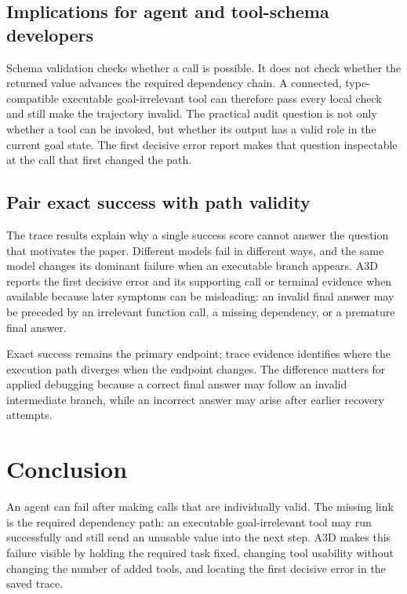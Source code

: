 \documentclass[pdflatex,sn-basic]{sn-jnl}
\begin{document}
\subsection{Implications for agent and tool-schema developers}

Schema validation checks whether a call is possible. It does not check whether
the returned value advances the required dependency chain. A connected,
type-compatible executable goal-irrelevant tool can therefore pass every local
check and still make the trajectory invalid. The practical audit question is not
only whether a tool can be invoked, but whether its output has a valid role in
the current goal state. The first decisive error report makes that question inspectable
at the call that first changed the path.

\subsection{Pair exact success with path validity}

The trace results explain why a single success score cannot answer the question
that motivates the paper. Different models fail in different ways, and the
same model changes its dominant failure when an executable branch appears.
A3D reports the first decisive error and its supporting call or terminal
evidence when available because later
symptoms can be misleading: an invalid final answer may be preceded by an
irrelevant function call, a missing dependency, or a premature final answer.

Exact success remains the primary endpoint; trace evidence identifies where the
execution path diverges when the endpoint changes. The difference matters for
applied debugging because a correct final
answer may follow an invalid intermediate branch, while an incorrect answer may
arise after earlier recovery attempts.

\section{Conclusion}

An agent can fail after making calls that are individually valid. The missing
link is the required dependency path: an executable goal-irrelevant tool may run
successfully and still send an unusable value into the next step. A3D makes this
failure visible by holding the required task fixed, changing tool usability
without changing the number of added tools, and locating the first
decisive error in the saved trace.
\end{document}
